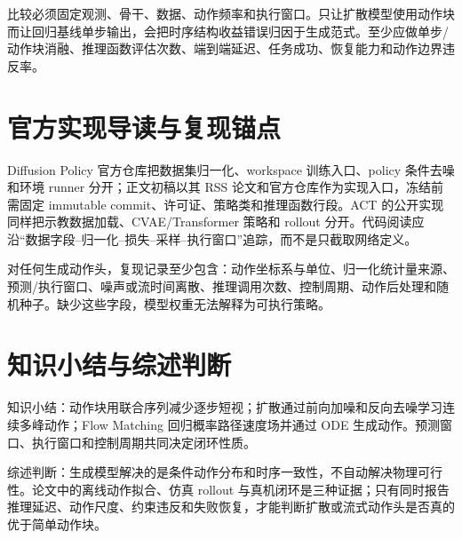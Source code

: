 比较必须固定观测、骨干、数据、动作频率和执行窗口。只让扩散模型使用动作块而让回归基线单步输出，会把时序结构收益错误归因于生成范式。至少应做单步/动作块消融、推理函数评估次数、端到端延迟、任务成功、恢复能力和动作边界违反率。

\section{官方实现导读与复现锚点}

Diffusion Policy 官方仓库把数据集归一化、workspace 训练入口、policy 条件去噪和环境 runner 分开；正文初稿以其 RSS 论文和官方仓库作为实现入口，冻结前需固定 immutable commit、许可证、策略类和推理函数行段。ACT 的公开实现同样把示教数据加载、CVAE/Transformer 策略和 rollout 分开。代码阅读应沿“数据字段--归一化--损失--采样--执行窗口”追踪，而不是只截取网络定义。

对任何生成动作头，复现记录至少包含：动作坐标系与单位、归一化统计量来源、预测/执行窗口、噪声或流时间离散、推理调用次数、控制周期、动作后处理和随机种子。缺少这些字段，模型权重无法解释为可执行策略。

\section{知识小结与综述判断}

知识小结：动作块用联合序列减少逐步短视；扩散通过前向加噪和反向去噪学习连续多峰动作；Flow Matching 回归概率路径速度场并通过 ODE 生成动作。预测窗口、执行窗口和控制周期共同决定闭环性质。

综述判断：生成模型解决的是条件动作分布和时序一致性，不自动解决物理可行性。论文中的离线动作拟合、仿真 rollout 与真机闭环是三种证据；只有同时报告推理延迟、动作尺度、约束违反和失败恢复，才能判断扩散或流式动作头是否真的优于简单动作块。
